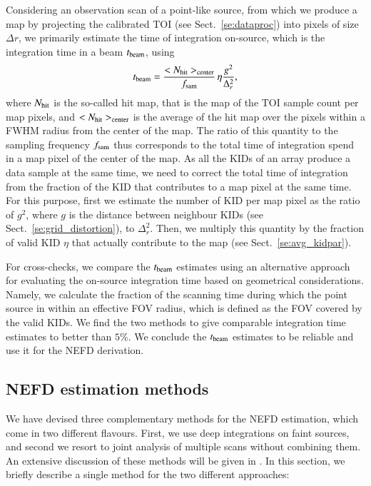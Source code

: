 Considering an observation scan of a point-like source, from which we
produce a map by projecting the calibrated TOI (see
Sect.~\ref{se:dataproc}) into pixels of size $\Delta r$, we primarily
estimate the time of integration on-source, which is the integration
time in a beam $t_{\rm{beam}}$, using
%
\begin{equation}
  t_{\rm{beam}} = \frac{<N_{\rm{hit}}>_{\rm{center}}}{f_{\rm{sam}}}\,
  \eta \frac{g^2}{\Delta_r^2},
  \label{eq:integration_time}
\end{equation}
%
where $N_{\rm{hit}}$ is the so-called hit map, that is the map of the
TOI sample count per map pixels, and $<N_{\rm{hit}}>_{\rm{center}}$
is the average of the hit map over the pixels within a FWHM radius
from the center of the map. The ratio of this quantity to the sampling
frequency $f_{\rm{sam}}$ thus corresponds to the total time of integration
spend in a map pixel of the center of the map. As all the KIDs of an
array produce a data sample at the same time, we need to correct the
total time of integration from the fraction of the KID that
contributes to a map pixel at the same time. For this purpose, first
we estimate the number of KID per map pixel as the ratio of $g^2$,
where $g$ is the distance between neighbour KIDs (see
Sect.~\ref{se:grid_distortion}), to $\Delta_r^2$. Then, we multiply
this quantity by the fraction of valid KID $\eta$ that actually
contribute to the map (see Sect.~\ref{se:avg_kidpar}). 

For cross-checks, we compare the $t_{\rm{beam}}$ estimates using an
alternative approach for evaluating the on-source integration
time based on geometrical considerations. Namely, we calculate the
fraction of the scanning time during which the point source in within
an effective FOV radius, which is defined as the FOV covered by the
valid KIDs. We find the two methods to give comparable integration
time estimates to better than $5\%$. We conclude the $t_{\rm{beam}}$
estimates to be reliable and use it for the NEFD derivation.  


\subsection{NEFD estimation methods}
\label{se:nefd_method}

We have devised three complementary methods for the
NEFD estimation, which come in two different flavours. First, we
use deep integrations on faint sources, and second we resort to 
joint analysis of multiple scans without combining them. An
extensive discussion of these methods will be given in
\citet{Ponthieu2019}. In this section, we briefly describe a single method
for the two different approaches: \\

